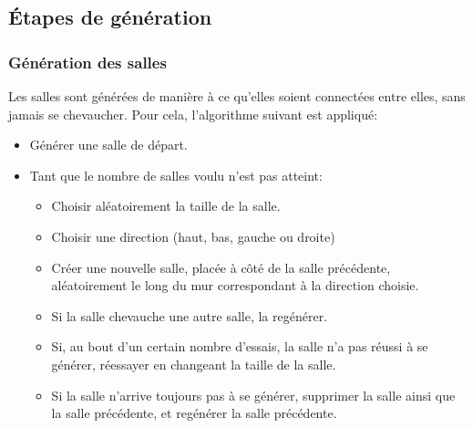 \documentclass[10pt]{report}
\begin{document}
\subsection{Étapes de génération}
\subsubsection{Génération des salles}

Les salles sont générées de manière à ce qu'elles soient connectées entre
elles, sans jamais se chevaucher.
Pour cela, l'algorithme suivant est appliqué:

\begin{itemize}
  \item Générer une salle de départ.
  \item Tant que le nombre de salles voulu n'est pas atteint:
  \begin{itemize}
    \item Choisir aléatoirement la taille de la salle.
    \item Choisir une direction (haut, bas, gauche ou droite)
    \item Créer une nouvelle salle, placée à côté de la salle précédente,
    aléatoirement le long du mur correspondant à la direction choisie.
    \item Si la salle chevauche une autre salle, la regénérer.
    \item Si, au bout d'un certain nombre d'essais, la salle n'a pas réussi
    à se générer, réessayer en changeant la taille de la salle.
    \item Si la salle n'arrive toujours pas à se générer, supprimer la
    salle ainsi que la salle précédente, et regénérer la salle précédente.
  \end{itemize}
\end{itemize}
\end{document}
